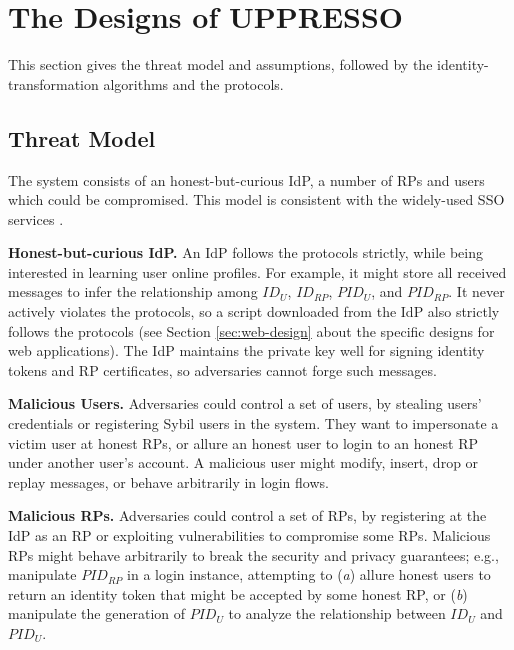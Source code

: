 
\section{The Designs of UPPRESSO}
\label{sec:UPPRESSO}

This section gives the threat model and assumptions,
    followed by the identity-transformation algorithms
    and the protocols.


\subsection{Threat Model}
\label{subsec:threatmodel}
The system consists of an honest-but-curious IdP, a number of RPs and users which could be compromised. %
This model is consistent with the widely-used SSO services \cite{OpenIDConnect,rfc6749,SAML,SAMLIdentifier,NIST2017draft}.

\noindent \textbf{Honest-but-curious IdP.}
An IdP follows the protocols strictly, while being interested in learning user online profiles.
For example, it might store all received messages
 to infer the relationship among $ID_U$, $ID_{RP}$, $PID_{U}$, and $PID_{RP}$.
It never actively violates the protocols,
so a script downloaded from the IdP also strictly follows the protocols (see Section \ref{sec:web-design} about the specific designs
    for web applications).
The IdP maintains the private key well for signing identity tokens and RP certificates, %
so adversaries cannot forge such messages.

\noindent \textbf{Malicious Users.}
Adversaries could control a set of users,
 by stealing users' credentials or registering Sybil users in the system.
They want to impersonate a victim user at honest RPs,
 or allure an honest user to login to an honest RP under another user's account.
A malicious user might
    modify, insert, drop or replay messages, or behave arbitrarily in login flows.

\noindent \textbf{Malicious RPs.}
Adversaries could control a set of RPs, by registering at the IdP as an RP
     or exploiting vulnerabilities to compromise some RPs.
Malicious RPs might behave arbitrarily to break the security and privacy guarantees;
e.g., manipulate $PID_{RP}$ in a login instance,
    attempting to (\emph{a}) allure honest users to return an identity token that might be accepted by some honest RP,
or (\emph{b}) manipulate the generation of $PID_U$ to
    analyze the relationship between $ID_U$ and $PID_U$.


